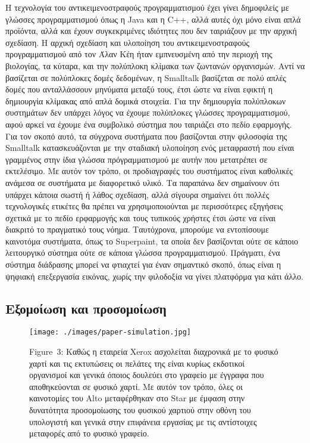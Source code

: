 \documentclass[
]{article}
\begin{document}
Η τεχνολογία του αντικειμενοστραφούς προγραμματισμού έχει γίνει
δημοφιλείς με γλώσσες προγραμματισμού όπως η Java και η C++, αλλά αυτές
όχι μόνο είναι απλά προϊόντα, αλλά και έχουν συγκεκριμένες ιδιότητες που
δεν ταιριάζουν με την αρχική σχεδίαση. Η αρχική σχεδίαση και υλοποίηση
του αντικειμενοστραφούς προγραμματισμού από τον Άλαν Κέη ήταν
εμπνευσμένη από την περιοχή της βιολογίας, τα κύταρα, και την πολύπλοκη
κλίμακα των ζωντανών οργανισμών. Αντί να βασίζεται σε πολύπλοκες δομές
δεδομένων, η Smalltalk βασίζεται σε πολύ απλές δομές που ανταλλάσσουν
μηνύματα μεταξύ τους, έτσι ώστε να είναι εφικτή η δημιουργία κλίμακας
από απλά δομικά στοιχεία. Για την δημιουργία πολύπλοκων συστημάτων δεν
υπάρχει λόγος να έχουμε πολύπλοκες γλώσσες προγραμματισμού, αφού αρκεί
να έχουμε ένα συμβολικό σύστημα που ταιριάζει στο πεδίο εφαρμογής. Για
τον σκοπό αυτό, τα σύγχρονα συστήματα που βασίζονται στην φιλοσοφία της
Smalltalk κατασκευάζονται με την σταδιακή υλοποίηση ενός μεταφραστή που
είναι γραμμένος στην ίδια γλώσσα πρόγραμματισμού με αυτήν που μετατρέπει
σε εκτελέσιμο. Με αυτόν τον τρόπο, οι προδιαγραφές του συστήματος είναι
καθολικές ανάμεσα σε συστήματα με διαφορετικό υλικό. Τα παραπάνω δεν
σημαίνουν ότι υπάρχει κάποια σωστή ή λάθος σχεδίαση, αλλά σίγουρα
σημαίνει ότι πολλές τεχνολογικές ετικέτες θα πρέπει να χρησιμοποιούνται
με περισσότερες εξηγήσεις σχετικά με το πεδίο ερφαρμογής και τους
τυπικούς χρήστες έτσι ώστε να είναι διακριτό το πραγματικό τους νόημα.
Ταυτόχρονα, μπορούμε να εντοπίσουμε καινοτόμα συστήματα, όπως το
Superpaint, τα οποία δεν βασίζονται ούτε σε κάποιο λειτουργικό σύστημα
ούτε σε κάποια γλώσσα προγραμματισμού. Πράγματι, ένα σύστημα διάδρασης
μπορεί να φτιαχτεί για έναν σημαντικό σκοπό, όπως είναι η ψηφιακή
επεξεργασία εικόνας, χωρίς την φιλοδοξία να γίνει πλατφόρμα για κάτι
άλλο.

\hypertarget{ux3b5ux3beux3bfux3bcux3bfux3afux3c9ux3c3ux3b7-ux3baux3b1ux3b9-ux3c0ux3c1ux3bfux3c3ux3bfux3bcux3bfux3afux3c9ux3c3ux3b7}{%
\subsection{Εξομοίωση και
προσομοίωση}\label{ux3b5ux3beux3bfux3bcux3bfux3afux3c9ux3c3ux3b7-ux3baux3b1ux3b9-ux3c0ux3c1ux3bfux3c3ux3bfux3bcux3bfux3afux3c9ux3c3ux3b7}}

\leavevmode{}%
\begin{figure}
\hypertarget{fig:paper-simulation}{%
\centering
\texttt{[image: ./images/paper-simulation.jpg]}
\caption{Figure~3: Καθώς η εταιρεία Xerox ασχολείται διαχρονικά με το
φυσικό χαρτί και τις εκτυπώσεις οι πελάτες της είναι κυρίως εκδοτικοί
οργανισμοί και γενικά όποιος δουλεύει στο γραφείο με έγγραφα που
αποθηκεύονται σε φυσικό χαρτί. Με αυτόν τον τρόπο, όλες οι καινοτομίες
του Alto μεταφέρθηκαν στο Star με έμφαση στην δυνατότητα προσομοίωσης
του φυσικού χαρτιού στην οθόνη του υπολογιστή και γενικά στην επιφάνεια
εργασίας με τις αντίστοιχες μεταφορές από το φυσικό
γραφείο.}\label{fig:paper-simulation}
}
\end{figure}
\end{document}
